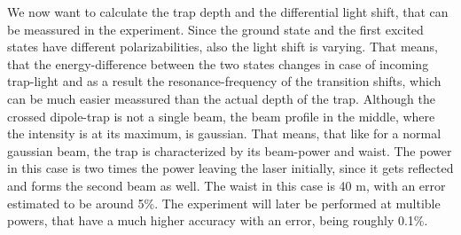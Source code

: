 We now want to calculate the trap depth and the differential light shift, that can be meassured in the experiment. Since the ground state and the first excited states have different polarizabilities, also the light shift is varying. That means, that the energy-difference between the two states changes in case of incoming trap-light and as a result the resonance-frequency of the transition shifts, which can be much easier meassured than the actual depth of the trap. Although the crossed dipole-trap is not a single beam, the beam profile in the middle, where the intensity is at its maximum, is gaussian. That means, that like for a normal gaussian beam, the trap is characterized by its beam-power and waist. The power in this case is two times the power leaving the laser initially, since it gets reflected and forms the second beam as well. The waist in this case is 40 \mu m, with an error estimated to be around 5\%. The experiment will later be performed at multible powers, that have a much higher accuracy with an error, being roughly 0.1\%.
